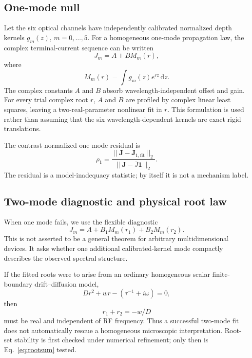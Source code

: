 \documentclass[11pt]{article}
\newcommand{\dd}{\mathrm{d}}
\begin{document}
\subsection{One-mode null}

Let the six optical channels have independently calibrated normalized depth kernels $g_m(z)$, $m=0,\ldots,5$. For a homogeneous one-mode propagation law, the complex terminal-current sequence can be written
\begin{equation}
\boxed{J_m=A+B M_m(r),}
\label{eq:onemode}
\end{equation}
where
\begin{equation}
M_m(r)=\int g_m(z)e^{rz}\,\dd z.
\label{eq:kernelmoment}
\end{equation}
The complex constants $A$ and $B$ absorb wavelength-independent offset and gain. For every trial complex root $r$, $A$ and $B$ are profiled by complex linear least squares, leaving a two-real-parameter nonlinear fit in $r$. This formulation is used rather than assuming that the six wavelength-dependent kernels are exact rigid translations.

The contrast-normalized one-mode residual is
\begin{equation}
\rho_1=\frac{\|\bm J-\bm J_{1,\mathrm{fit}}\|_2}{\|\bm J-\bar J\bm 1\|_2}.
\label{eq:rho1}
\end{equation}
The residual is a model-inadequacy statistic; by itself it is not a mechanism label.

\subsection{Two-mode diagnostic and physical root law}

When one mode fails, we use the flexible diagnostic
\begin{equation}
J_m=A+B_1M_m(r_1)+B_2M_m(r_2).
\label{eq:twomode}
\end{equation}
This is not asserted to be a general theorem for arbitrary multidimensional devices. It asks whether one additional calibrated-kernel mode compactly describes the observed spectral structure.

If the fitted roots were to arise from an ordinary homogeneous scalar finite-boundary drift--diffusion model,
\begin{equation}
D r^2+w r-(\tau^{-1}+i\omega)=0,
\label{eq:quadratic}
\end{equation}
then
\begin{equation}
\boxed{r_1+r_2=-w/D}
\label{eq:rootsum}
\end{equation}
must be real and independent of RF frequency. Thus a successful two-mode fit does not automatically rescue a homogeneous microscopic interpretation. Root-set stability is first checked under numerical refinement; only then is Eq.~\eqref{eq:rootsum} tested.
\end{document}
